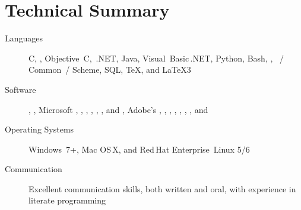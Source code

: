 \documentclass{simplecv}
\begin{document}
\maketitle
\vfill
\section{Technical Summary}
\begin{minipage}{\textwidth}
\begin{description}
\item[Languages]
  C,
  \CPP,
  Objective~C,
  \CSharp\,.NET,
  Java,
  Visual~Basic\,.NET,
  Python,
  Bash,
  ,
  ~\Lisp\slash
            Common~\Lisp\slash
            Scheme,
  SQL,
  \TeX,
  and
  \LaTeX 3

\item[Software]
  ,
  ,
  Microsoft ,
            ,
            ,
            ,
            ,
            ,
            and
            ,
  Adobe's
    ,
    ,
    ,
  ,
  ,
  ,
  ,
  and

\item[Operating Systems]
  Windows~7+,
  Mac OS\,X,
  and
  Red\,Hat Enterprise~Linux 5\slash 6

\item[Communication]
  Excellent communication skills, both written and oral,
    with experience in literate programming
\end{description}
\end{minipage}

\vfill
\end{document}
